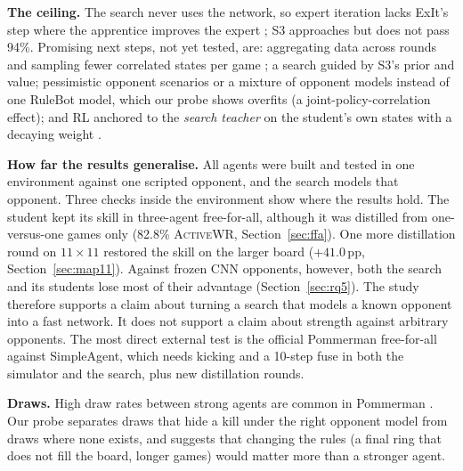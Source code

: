 \documentclass[11pt]{article}
\newcommand{\awr}{\textsc{ActiveWR}}
\newcommand{\pp}{\,pp}
\begin{document}
\textbf{The ceiling.} The search never uses the network, so expert iteration lacks ExIt's step where the apprentice improves the expert \cite{anthony2017exit,silver2017agz}; S3 approaches but does not pass 94\%. Promising next steps, not yet tested, are: aggregating data across rounds and sampling fewer correlated states per game \cite{anthony2017exit,ross2011dagger}; a search guided by S3's prior and value; pessimistic opponent scenarios \cite{osogami2019} or a mixture of opponent models \cite{lanctot2017psro} instead of one RuleBot model, which our probe shows overfits (a joint-policy-correlation effect); and RL anchored to the \emph{search teacher} on the student's own states with a decaying weight \cite{schmitt2018kickstart}.

\textbf{How far the results generalise.} All agents were built and tested in one environment against one scripted opponent, and the search models that opponent. Three checks inside the environment show where the results hold. The student kept its skill in three-agent free-for-all, although it was distilled from one-versus-one games only (82.8\% \awr{}, Section~\ref{sec:ffa}). One more distillation round on $11\times11$ restored the skill on the larger board ($+41.0$\pp{}, Section~\ref{sec:map11}). Against frozen CNN opponents, however, both the search and its students lose most of their advantage (Section~\ref{sec:rq5}). The study therefore supports a claim about turning a search that models a known opponent into a fast network. It does not support a claim about strength against arbitrary opponents. The most direct external test is the official Pommerman free-for-all against SimpleAgent, which needs kicking and a 10-step fuse in both the simulator and the search, plus new distillation rounds.

\textbf{Draws.} High draw rates between strong agents are common in Pommerman \cite{osogami2019,perezliebana2019,gao2019skynet}. Our probe separates draws that hide a kill under the right opponent model from draws where none exists, and suggests that changing the rules (a final ring that does not fill the board, longer games) would matter more than a stronger agent.
\end{document}
